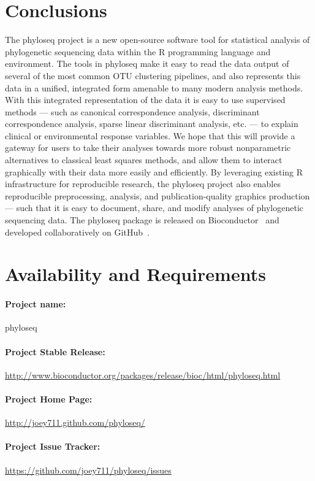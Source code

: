 \documentclass[10pt]{article}\usepackage{graphicx, color}
\newcommand{\R}{{\textsf{R}}}
\begin{document}
\section*{Conclusions}
The phyloseq project is a new open-source software tool
for statistical analysis of phylogenetic sequencing data
within the \R{} programming language and environment.
The tools in phyloseq make it easy to
read the data output of several of the most common
OTU clustering pipelines,
and also represents this data in a unified, integrated form
amenable to many modern analysis methods.
With this integrated representation of the data
it is easy to use supervised methods ---
such as canonical correspondence analysis,
discriminant correspondence analysis,
sparse linear discriminant analysis, etc.
---
to explain clinical or environmental response variables.
We hope that this will provide a gateway for users
to take their analyses towards more robust nonparametric alternatives
to classical least squares methods,
and allow them to interact graphically with their data
more easily and efficiently.
By leveraging existing \R{} infrastructure for reproducible research,
the phyloseq project also enables reproducible
preprocessing,
analysis,
and publication-quality graphics production ---
such that it is easy to document, share, and modify
analyses of phylogenetic sequencing data.
The phyloseq package 
is released on Bioconductor~\cite{Bioconductor}
and developed collaboratively on GitHub~\cite{phyloseq:github}.


\clearpage
\section*{Availability and Requirements}
\paragraph*{Project name:} phyloseq
\paragraph*{Project Stable Release:} \url{http://www.bioconductor.org/packages/release/bioc/html/phyloseq.html} 
\paragraph*{Project Home Page:} \url{http://joey711.github.com/phyloseq/} 
\paragraph*{Project Issue Tracker:} \url{https://github.com/joey711/phyloseq/issues} 
\end{document}
